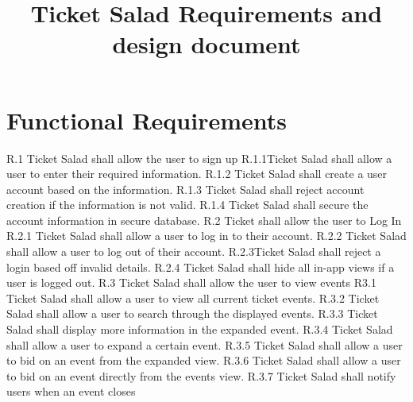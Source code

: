 \documentclass[11pt]{article}
\begin{document}
	\title{Ticket Salad Requirements and design document}
	\date{}
	\maketitle
	\tableofcontents
	\newpage
	
	\section{Functional Requirements}
	R.1 Ticket Salad shall allow the user to sign up \newline
	R.1.1Ticket Salad shall allow a user to enter their required information.\newline
	R.1.2 Ticket Salad shall create a user account based on the information.\newline
	R.1.3 Ticket Salad shall reject account creation if the information is not valid.\newline
	R.1.4 Ticket Salad shall secure the account information in secure database.\newline\newline
	R.2 Ticket shall allow the user to Log In\newline
	R.2.1 Ticket Salad shall allow a user to log in to their account.\newline
	R.2.2 Ticket Salad shall allow a user to log out of their account.\newline
	R.2.3Ticket Salad shall reject a login based off invalid details.\newline
	R.2.4 Ticket Salad shall hide all in-app views if a user is logged out.\newline\newline
	R.3 Ticket Salad shall allow the user to view events
	\newline R3.1 Ticket Salad shall allow a user to view all current ticket events.
	\newline R.3.2 Ticket Salad shall allow a user to search through the displayed events.
	\newline R.3.3 Ticket Salad shall display more information in the expanded event.
	\newline R.3.4 Ticket Salad shall allow a user to expand a certain event.
	\newline R.3.5 Ticket Salad shall allow a user to bid on an event from the expanded view.
	\newline R.3.6 Ticket Salad shall allow a user to bid on an event directly from the events view.
	\newline R.3.7 Ticket Salad shall notify users when an event closes
\end{document}
